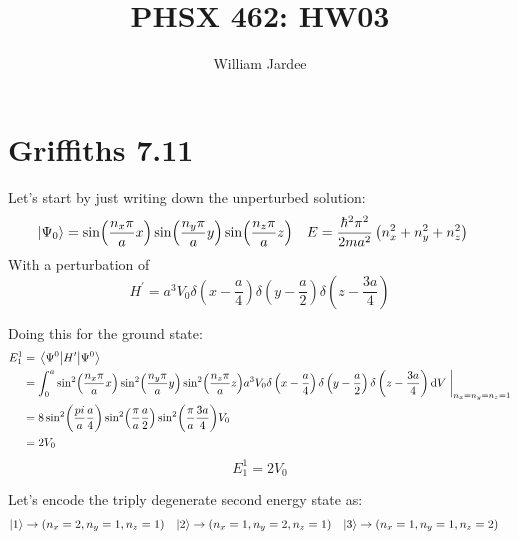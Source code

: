 \documentclass[11pt]{article}
\begin{document}
\title{PHSX 462: HW03}
\author{William Jardee}
\maketitle

\section*{Griffiths 7.11}
Let's start by just writing down the unperturbed solution:
\begin{align*}
\ket{\Psi_0} & = \sin(\frac{n_x \pi}{a}x)\sin(\frac{n_y \pi}{a}y)\sin(\frac{n_z\pi}{a}z) & E & = \frac{\hbar^2 \pi^2}{2ma^2}\left(n_x^2 + n_y^2 + n_z^2\right)
\end{align*}
With a perturbation of
\[H^\prime = a^3 V_0 \delta\left(x-\frac{a}{4}\right)\delta\left(y - \frac{a}{2}\right)\delta\left(z - \frac{3a}{4}\right)\]

Doing this for the ground state:
\begin{align*}
E_1^1 & = \ev{H^\prime}{\Psi^0}\\
& = \int_0^a \sin[2](\frac{n_x\pi}{a}x)\sin[2](\frac{n_y\pi}{a}y)\sin[2](\frac{n_z \pi}{a}z)a^3 V_0 \delta\left(x-\frac{a}{4}\right)\delta\left(y - \frac{a}{2}\right)\delta\left(z - \frac{3a}{4}\right)\dd{V}\eval_{n_x = n_y=n_z = 1}\\
&= 8\sin[2](\frac{pi}{a}\frac{a}{4})\sin[2](\frac{\pi}{a}\frac{a}{2})\sin[2](\frac{\pi}{a}\frac{3a}{4})V_0\\
& = 2V_0
\end{align*}
\[\boxed{E_1^1 = 2V_0}\]

Let's encode the triply degenerate second energy state as:
\begin{align*}
\ket{1} & \rightarrow \left(n_x = 2, n_y=1, n_z=1\right) & \ket{2} & \rightarrow \left(n_x = 1, n_y=2, n_z=1\right) & \ket{3} & \rightarrow \left(n_x = 1, n_y=1, n_z=2\right)
\end{align*}
\end{document}
